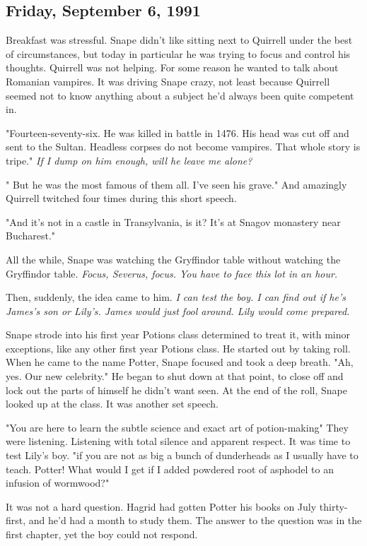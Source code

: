 \subsection{Friday, September 6, 1991}

Breakfast was stressful. Snape didn't like sitting next to Quirrell under the best of circumstances, but today in particular he was trying to focus and control his thoughts. Quirrell was not helping. For some reason he wanted to talk about Romanian vampires. It was driving Snape crazy, not least because Quirrell seemed not to know anything about a subject he'd always been quite competent in.

"Fourteen-seventy-six. He was killed in battle in 1476. His head was cut off and sent to the Sultan. Headless corpses do not become vampires. That whole story is tripe." \emph{If I dump on him enough, will he leave me alone?}

"{\el} But he was the{\el} most famous of them{\el} all. I've{\el} seen his{\el} grave." And amazingly Quirrell twitched four times during this short speech.

"And it's not in a castle in Transylvania, is it? It's at Snagov monastery near Bucharest."

All the while, Snape was watching the Gryffindor table without watching the Gryffindor table. \emph{Focus, Severus, focus. You have to face this lot in an hour.}

Then, suddenly, the idea came to him. \emph{I can test the boy. I can find out if he's James's son or Lily's. James would just fool around. Lily would come prepared.}

Snape strode into his first year Potions class determined to treat it, with minor exceptions, like any other first year Potions class. He started out by taking roll. When he came to the name Potter, Snape focused and took a deep breath. "Ah, yes. Our new celebrity." He began to shut down at that point, to close off and lock out the parts of himself he didn't want seen. At the end of the roll, Snape looked up at the class. It was another set speech.

"You are here to learn the subtle science and exact art of potion-making{\el}" They were listening. Listening with total silence and apparent respect. It was time to test Lily's boy. "{\el}if you are not as big a bunch of dunderheads as I usually have to teach. Potter! What would I get if I added powdered root of asphodel to an infusion of wormwood?"

It was not a hard question. Hagrid had gotten Potter his books on July thirty-first, and he'd had a month to study them. The answer to the question was in the first chapter, yet the boy could not respond.


